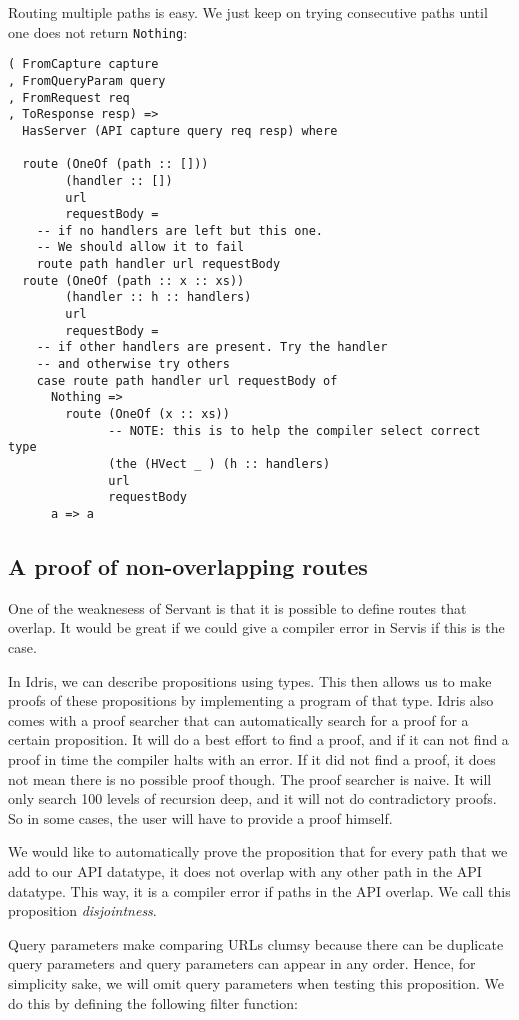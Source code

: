 \documentclass[12pt,a4paper]{article}
\begin{document}
Routing multiple paths is easy. We just keep on trying consecutive paths until one
does not return \texttt{Nothing}:
\begin{verbatim}
( FromCapture capture
, FromQueryParam query
, FromRequest req
, ToResponse resp) =>
  HasServer (API capture query req resp) where

  route (OneOf (path :: []))
        (handler :: [])
        url
        requestBody =
    -- if no handlers are left but this one.
    -- We should allow it to fail
    route path handler url requestBody
  route (OneOf (path :: x :: xs))
        (handler :: h :: handlers)
        url
        requestBody =
    -- if other handlers are present. Try the handler
    -- and otherwise try others
    case route path handler url requestBody of
      Nothing =>
        route (OneOf (x :: xs))
              -- NOTE: this is to help the compiler select correct type
              (the (HVect _ ) (h :: handlers)
              url
              requestBody
      a => a
\end{verbatim}

\subsection{A proof of non-overlapping routes}
One of the weaknesess of Servant is that it is possible to define routes that overlap.
It would be great if we could give a compiler error in Servis if this is the case.

In Idris, we can describe propositions using types. This then allows us to make proofs of these propositions by implementing a program of that type.  Idris also comes with a proof searcher that can automatically search for a proof for a certain proposition. It will do a best effort to find a proof, and if it can not find a proof in time the compiler halts with an error. If it did not find a proof, it does not mean there is no possible proof though. The proof searcher is naive. It will only search 100 levels of recursion deep, and it will not do contradictory proofs. So in some cases, the user will have to provide a proof himself. 

We would like to automatically prove the proposition that for every path that we add to our API datatype, it does not overlap with any other path in the API datatype. This way, it is a compiler error if paths in the API overlap. We call this proposition \emph{disjointness}.

Query parameters make comparing URLs clumsy because there can be duplicate query parameters and query parameters can appear in any order. Hence, for simplicity sake, we will omit query parameters when testing this proposition.  We do this by defining the following filter function:
\end{document}
